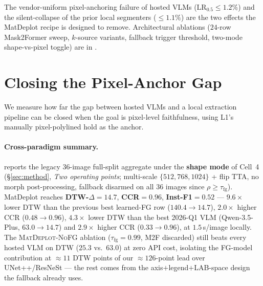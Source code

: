 \documentclass{article}
\begin{document}
The vendor-uniform pixel-anchoring failure of hosted VLMs
($\mathrm{LR}_{0.5}{\le}1.2\%$) and the silent-collapse of the
prior local segmenters ($\le 1.1\%$) are the two effects the
MatDeplot recipe is designed to remove. Architectural ablations
($24$-row Mask2Former sweep, $k$-source variants, fallback
trigger threshold, two-mode shape-vs-pixel toggle) are in
.


\section{Closing the Pixel-Anchor Gap}
\label{sec:results}
We measure how far the gap between hosted VLMs and a local
extraction pipeline can be closed when the goal is pixel-level
faithfulness, using L1's manually pixel-polylined hold as the
anchor.

\paragraph{Cross-paradigm summary.}
 reports the legacy $36$-image full-split aggregate
under the \textbf{shape mode} of Cell~4
(\S\ref{sec:method}, \emph{Two operating points}; multi-scale
$\{512,768,1024\}$ + flip TTA, no morph post-processing,
fallback disarmed on all $36$ images since $\rho\geq\tau_{\mathrm{fg}}$).
MatDeplot reaches
\textbf{DTW-$\Delta{=}14.7$}, \textbf{CCR${=}0.96$},
\textbf{Inst-F1${=}0.52$} --- $\mathbf{9.6\times}$ lower DTW than
the previous best learned-FG row ($140.4{\to}14.7$),
$\mathbf{2.0\times}$ higher CCR ($0.48{\to}0.96$),
$\mathbf{4.3\times}$ lower DTW than the best 2026-Q1 VLM
(Qwen-3.5-Plus, $63.0{\to}14.7$) and $\mathbf{2.9\times}$ higher
CCR ($0.33{\to}0.96$), at $1.5$\,s/image locally. The
\textsc{MatDeplot-NoFG} ablation
($\tau_{\mathrm{fg}}{=}0.99$, M2F discarded) still beats every
hosted VLM on DTW ($25.3$ vs.\ $63.0$) at zero API cost,
isolating the FG-model contribution at $\approx 11$ DTW points
of our $\approx 126$-point lead over UNet++/ResNeSt --- the rest
comes from the axis$+$legend$+$LAB-space design the fallback already
uses.
\end{document}
